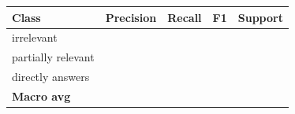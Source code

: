 \begin{tabular}{lcccc}
\toprule
\textbf{Class} & \textbf{Precision} & \textbf{Recall} & \textbf{F1} & \textbf{Support} \\
\midrule
irrelevant & \ph{--} & \ph{--} & \ph{--} & \ph{--} \\
partially relevant & \ph{--} & \ph{--} & \ph{--} & \ph{--} \\
directly answers & \ph{--} & \ph{--} & \ph{--} & \ph{--} \\
\midrule
\textbf{Macro avg} & \ph{--} & \ph{--} & \ph{--} & \\
\bottomrule
\end{tabular}
